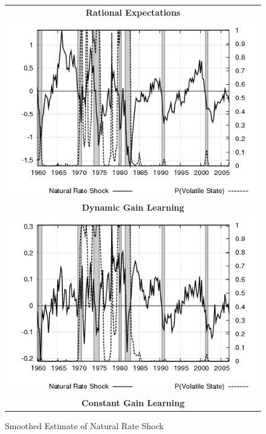 \begin{figure}[ht]
\begin{center}
\begin{tabular}{c}
\end{tabular}
\end{center}
\end{figure}

\begin{figure}[ht]
\caption{Smoothed Estimate of Natural Rate Shock}\label{fg3:natrate}
\begin{center}
\begin{tabular}{c}
\textbf{Rational Expectations} \\  
\includegraphics[scale=0.5]{results_re/natrate.png} \\
\textbf{Dynamic Gain Learning} \\
\includegraphics[scale=0.5]{results_dg8_wlsinit/natrate.png} \\
\textbf{Constant Gain Learning} \\

\end{tabular}
\end{center}
\end{figure}
